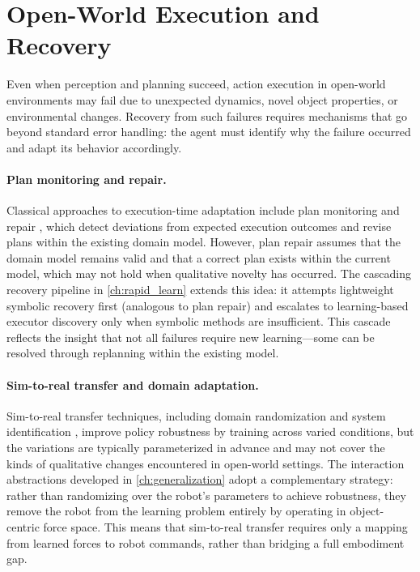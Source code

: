 \section{Open-World Execution and Recovery}
\label{sec:rw_execution}
\label{sec:open_world_execution_recovery}

Even when perception and planning succeed, action execution in open-world environments may fail due to unexpected dynamics, novel object properties, or environmental changes. Recovery from such failures requires mechanisms that go beyond standard error handling: the agent must identify why the failure occurred and adapt its behavior accordingly.

\paragraph{Plan monitoring and repair.}
Classical approaches to execution-time adaptation include plan monitoring and repair \citep{fox2006plan, fritz2007monitoring}, which detect deviations from expected execution outcomes and revise plans within the existing domain model. However, plan repair assumes that the domain model remains valid and that a correct plan exists within the current model, which may not hold when qualitative novelty has occurred. The cascading recovery pipeline in \cref{ch:rapid_learn} extends this idea: it attempts lightweight symbolic recovery first (analogous to plan repair) and escalates to learning-based executor discovery only when symbolic methods are insufficient. This cascade reflects the insight that not all failures require new learning---some can be resolved through replanning within the existing model.

\paragraph{Sim-to-real transfer and domain adaptation.}
Sim-to-real transfer techniques, including domain randomization \citep{tobin2017domain} and system identification \citep{peng2018sim}, improve policy robustness by training across varied conditions, but the variations are typically parameterized in advance and may not cover the kinds of qualitative changes encountered in open-world settings. The interaction abstractions developed in \cref{ch:generalization} adopt a complementary strategy: rather than randomizing over the robot's parameters to achieve robustness, they remove the robot from the learning problem entirely by operating in object-centric force space. This means that sim-to-real transfer requires only a mapping from learned forces to robot commands, rather than bridging a full embodiment gap.

